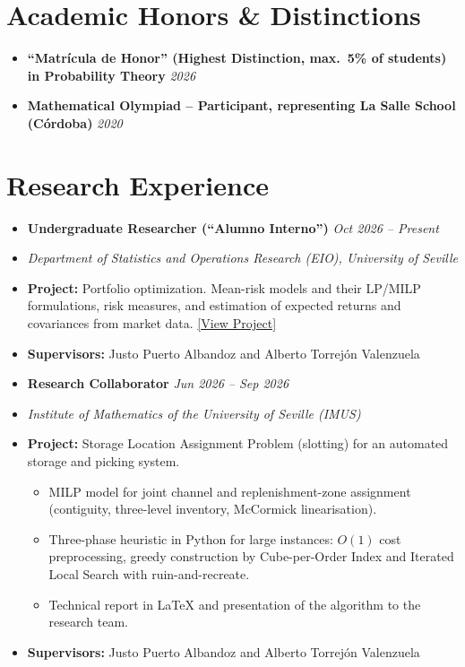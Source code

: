 \documentclass[11pt, a4paper]{article}
\newcommand{\cvgithub}{RBenitezGonzalez}
\newcommand{\cvrepo}{https://github.com/\cvgithub/Academic-Work}
\newcommand{\entry}[2]{\item[] \textbf{#1} \hfill \textit{#2}}
\newcommand{\separator}{%
	\vspace{-4mm}
	\begin{center} \textperiodcentered \quad \textperiodcentered \quad \textperiodcentered \end{center}
	\vspace{-4.5mm}}
\begin{document}
	\section*{Academic Honors \& Distinctions}
	\begin{itemize}
		\entry{``Matrícula de Honor'' (Highest Distinction, max.\ 5\% of students) in Probability Theory}{2026}
		\entry{Mathematical Olympiad -- Participant, representing La Salle School (Córdoba)}{2020}
	\end{itemize}

	\section*{Research Experience}

	\begin{itemize}
		\entry{Undergraduate Researcher (``Alumno Interno'')}{Oct 2026 -- Present}
		\item[] \textit{Department of Statistics and Operations Research (EIO), University of Seville}
		\item[] \textbf{Project:} Portfolio optimization. Mean-risk models and their LP/MILP formulations, risk measures, and estimation of expected returns and covariances from market data. \href{\cvrepo/tree/main/Projects/Portfolio-Optimization}{\color{darkblue}[View Project]}
		\item[] \textbf{Supervisors:} Justo Puerto Albandoz and Alberto Torrejón Valenzuela
	\end{itemize}

	\separator

	\begin{itemize}
		\entry{Research Collaborator}{Jun 2026 -- Sep 2026}
		\item[] \textit{Institute of Mathematics of the University of Seville (IMUS)}
		\item[] \textbf{Project:} Storage Location Assignment Problem (slotting) for an automated storage and picking system.
		\begin{itemize}
			\item MILP model for joint channel and replenishment-zone assignment (contiguity, three-level inventory, McCormick linearisation).
			\item Three-phase heuristic in Python for large instances: $O(1)$ cost preprocessing, greedy construction by Cube-per-Order Index and Iterated Local Search with ruin-and-recreate.
			\item Technical report in \LaTeX{} and presentation of the algorithm to the research team.
		\end{itemize}
		\item[] \textbf{Supervisors:} Justo Puerto Albandoz and Alberto Torrejón Valenzuela
	\end{itemize}
\end{document}
